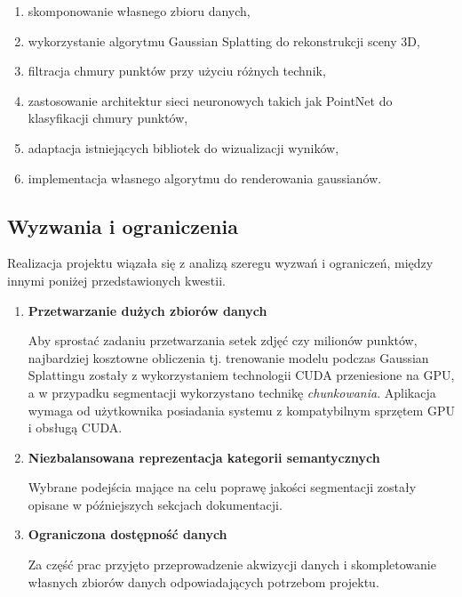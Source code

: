 \begin{enumerate}
    \item skomponowanie własnego zbioru danych, 
    \item wykorzystanie algorytmu Gaussian Splatting do rekonstrukcji sceny 3D,
    \item filtracja chmury punktów przy użyciu różnych technik, 
    \item zastosowanie architektur sieci neuronowych takich jak PointNet do klasyfikacji chmury punktów, 
    \item adaptacja istniejących bibliotek do wizualizacji wyników, 
    \item implementacja własnego algorytmu do renderowania gaussianów.
\end{enumerate}

\subsection{Wyzwania i ograniczenia}

Realizacja projektu wiązała się z analizą szeregu wyzwań i ograniczeń, między innymi poniżej przedstawionych kwestii.

\begin{enumerate}
    \item \textbf{Przetwarzanie dużych zbiorów danych}   
    
    Aby sprostać zadaniu przetwarzania setek zdjęć czy milionów punktów, najbardziej kosztowne obliczenia tj. trenowanie modelu podczas Gaussian Splattingu zostały z wykorzystaniem technologii CUDA przeniesione na GPU, a w przypadku segmentacji wykorzystano technikę \textit{chunkowania}. Aplikacja wymaga od użytkownika posiadania systemu z kompatybilnym sprzętem GPU i obsługą CUDA.
    \item \textbf{Niezbalansowana reprezentacja kategorii semantycznych}    
    
    Wybrane podejścia mające na celu poprawę jakości segmentacji zostały opisane w późniejszych sekcjach dokumentacji.
    \item \textbf{Ograniczona dostępność danych}    
    
    Za część prac przyjęto przeprowadzenie akwizycji danych i skompletowanie własnych zbiorów danych odpowiadających potrzebom projektu. 
\end{enumerate}